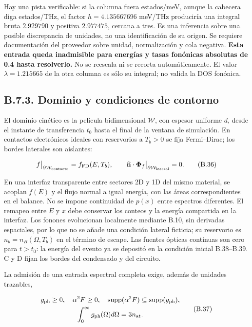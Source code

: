 \documentclass[
  spanish,
  10pt,
  a4paper,
]{article}
\newcounter{none} %
\begin{document}
Hay una pista verificable: si la columna fuera estados/meV, aunque la
cabecera diga estados/THz, el factor \(h=4.135667696\) meV/THz
produciría una integral bruta \(2.929790\) y positiva \(2.977475\),
cercana a tres. Es una inferencia sobre una posible discrepancia de
unidades, no una identificación de su origen. Se requiere documentación
del proveedor sobre unidad, normalización y cola negativa. \textbf{Esta
entrada queda inadmisible para energías y tasas fonónicas absolutas de
0.4 hasta resolverlo.} No se reescala ni se recorta automáticamente. El
valor \(\lambda=1.215665\) de la otra columna es sólo su integral; no
valida la DOS fonónica.

\subsection{B.7.3. Dominio y condiciones de
contorno}\label{b.7.3.-dominio-y-condiciones-de-contorno}

El dominio cinético es la película bidimensional \(\mathcal W\), con
espesor uniforme \(d\), desde el instante de transferencia \(t_0\) hasta
el final de la ventana de simulación. En contactos electrónicos ideales
con reservorios a \(T_b>0\) se fija Fermi--Dirac; los bordes laterales
son aislantes:

\[
f\big|_{\partial\mathcal W_{\rm contacto}}=f_{\rm FD}(E,T_b),
\qquad
\widehat{\mathbf n}\cdot\boldsymbol\Phi_f\big|_{\partial\mathcal W_{\rm lateral}}=0.
\tag{B.36}
\]

En una interfaz transparente entre sectores 2D y 1D del mismo material,
se acoplan \(f(E)\) y el flujo normal a igual energía, con las áreas
correspondientes en el balance. No se impone continuidad de \(p(x)\)
entre espectros diferentes. El remapeo entre \(E\) y \(x\) debe
conservar los conteos y la energía compartida en la interfaz. Los
fonones evolucionan localmente mediante B.10, sin derivadas espaciales,
por lo que no se añade una condición lateral ficticia; su reservorio es
\(n_b=n_B(\Omega,T_b)\) en el término de escape. Las fuentes ópticas
continuas son cero para \(t>t_0\): la energía del evento ya se depositó
en la condición inicial B.38--B.39. C y D fijan los bordes del
condensado y del circuito.

La admisión de una entrada espectral completa exige, además de unidades
trazables,

\[
\begin{gathered}
g_{\rm ph}\geq0,\quad \alpha^2F\geq0,\quad
\operatorname{supp}(\alpha^2F)\subseteq\operatorname{supp}(g_{\rm ph}),\\
\int_0^\infty g_{\rm ph}(\Omega)d\Omega=3n_{\rm at}.
\end{gathered}
\tag{B.37}
\]
\end{document}
